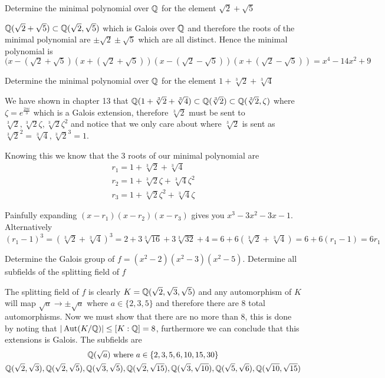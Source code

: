 \begin{exercise}
    Determine the minimal polynomial over $\mathbb{Q}$ for the element $\sqrt{2}+\sqrt{5}$
\end{exercise}
\begin{solution}
    $\mathbb{Q}(\sqrt{2}+\sqrt{5}) \subset \mathbb{Q}(\sqrt{2}, \sqrt{5})$ which is Galois over $\mathbb{Q}$ and therefore the roots of the minimal polynomial are $\pm\sqrt{2}\pm\sqrt{5}$ which are all distinct. Hence the minimal polynomial is $(x-(\sqrt{2}+\sqrt{5})(x + (\sqrt{2}+\sqrt{5}))(x - (\sqrt{2}-\sqrt{5}))(x + (\sqrt{2}-\sqrt{5})) = x^4 - 14x^2 + 9$
\end{solution}
\begin{exercise}
    Determine the minimal polynomial over $\mathbb{Q}$ for the element $1 + \sqrt[3]{2} + \sqrt[3]{4}$
\end{exercise}
\begin{solution}
    We have shown in chapter 13 that $\mathbb{Q}(1 + \sqrt[3]{2} + \sqrt[3]{4}) \subset \mathbb{Q}(\sqrt[3]{2}) \subset \mathbb{Q}(\sqrt[3]{2}, \zeta)$ where $\zeta = e^{\frac{2\pi i}{3}}$ which is a Galois extension, therefore $\sqrt[3]{2}$ must be sent to $\sqrt[3]{2}, \sqrt[3]{2}\zeta, \sqrt[3]{2}\zeta^2$ and notice that we only care about where $\sqrt[3]{2}$ is sent as $\sqrt[3]{2}^2 = \sqrt[3]{4}, \sqrt[3]{2}^3 = 1$.

    Knowing this we know that the 3 roots of our minimal polynomial are
    \begin{align*}
        r_1 = 1 + \sqrt[3]{2} + \sqrt[3]{4} \\
        r_2 = 1 + \sqrt[3]{2}\zeta + \sqrt[3]{4}\zeta^2 \\
        r_3 = 1 + \sqrt[3]{2}\zeta^2 + \sqrt[3]{4}\zeta
    \end{align*}

    Painfully expanding $(x - r_1)(x - r_2)(x - r_3)$ gives you $x^3 - 3x^2 - 3x - 1$. Alternatively $(r_1-1)^3=(\sqrt[3]{2} + \sqrt[3]{4})^3=2+3\sqrt[3]{16}+3\sqrt[3]{32}+4=6+6(\sqrt[3]{2}+\sqrt[3]{4})=6+6(r_1-1)=6r_1$
\end{solution}

\begin{exercise}
    Determine the Galois group of $f = (x^2 - 2)(x^2 - 3)(x^2 - 5)$. Determine all subfields of the splitting field of $f$
\end{exercise}
\begin{solution}
    The splitting field of $f$ is clearly $K = \mathbb{Q}(\sqrt{2},\sqrt{3},\sqrt{5})$ and any automorphism of $K$ will map $\sqrt{a} \to \pm \sqrt{a}$ where $a \in \{2,3,5\}$ and therefore there are 8 total automorphisms. Now we must show that there are no more than 8, this is done by noting that $|\operatorname{Aut}(K/\mathbb{Q})| \leq [K:\mathbb{Q}] = 8$, furthermore we can conclude that this extensions is Galois. 
    The subfields are 
    \begin{multline*}
        \mathbb{Q}(\sqrt{a}) \text{ where } a \in \{2,3,5,6,10,15,30\} \\ \mathbb{Q}(\sqrt{2},\sqrt{3}), \mathbb{Q}(\sqrt{2},\sqrt{5}), \mathbb{Q}(\sqrt{3},\sqrt{5}), \mathbb{Q}(\sqrt{2},\sqrt{15}), \mathbb{Q}(\sqrt{3},\sqrt{10}), \mathbb{Q}(\sqrt{5},\sqrt{6}),
        \mathbb{Q}(\sqrt{10}, \sqrt{15})
    \end{multline*}        
\end{solution}

